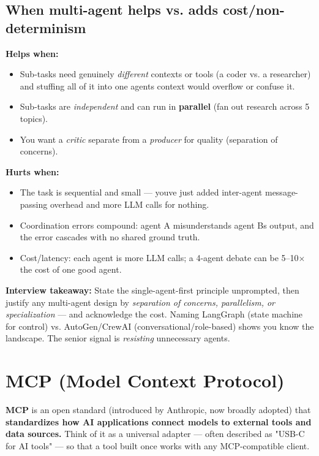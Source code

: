 \documentclass[11pt]{article}
\providecommand{\tightlist}{\setlength{\itemsep}{1pt}\setlength{\parskip}{0pt}}
\begin{document}
\subsection{When multi-agent helps vs. adds cost/non-determinism}\label{when-multi-agent-helps-vs-adds-costnon-determinism}

\textbf{Helps when:}

\begin{itemize}
\tightlist
\item
  Sub-tasks need genuinely \emph{different} contexts or tools (a coder vs. a researcher) and stuffing all of it into one agent\textquotesingle s context would overflow or confuse it.
\item
  Sub-tasks are \emph{independent} and can run in \textbf{parallel} (fan out research across 5 topics).
\item
  You want a \emph{critic} separate from a \emph{producer} for quality (separation of concerns).
\end{itemize}

\textbf{Hurts when:}

\begin{itemize}
\tightlist
\item
  The task is sequential and small --- you\textquotesingle ve just added inter-agent message-passing overhead and more LLM calls for nothing.
\item
  Coordination errors compound: agent A misunderstands agent B\textquotesingle s output, and the error cascades with no shared ground truth.
\item
  Cost/latency: each agent is more LLM calls; a 4-agent debate can be 5--10\(\times\) the cost of one good agent.
\end{itemize}

\textbf{Interview takeaway:} State the single-agent-first principle unprompted, then justify any multi-agent design by \emph{separation of concerns, parallelism, or specialization} --- and acknowledge the cost. Naming LangGraph (state machine for control) vs. AutoGen/CrewAI (conversational/role-based) shows you know the landscape. The senior signal is \emph{resisting} unnecessary agents.

\section{MCP (Model Context Protocol)}\label{mcp-model-context-protocol}

\textbf{MCP} is an open standard (introduced by Anthropic, now broadly adopted) that \textbf{standardizes how AI applications connect models to external tools and data sources.} Think of it as a universal adapter --- often described as "USB-C for AI tools" --- so that a tool built once works with any MCP-compatible client.
\end{document}

